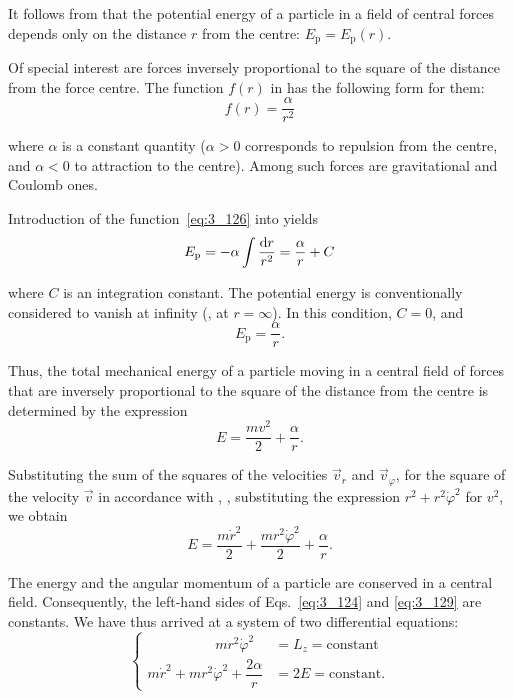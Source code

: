 \noindent
It follows from  that the potential energy of a particle in a field of central forces depends only on the distance $r$ from the centre: $E_{\text{p}}=E_{\text{p}}(r)$.

Of special interest are forces inversely proportional to the square of the distance from the force centre. The function $f(r)$ in  has the following form for them:
\begin{equation}\label{eq:3_126}
f(r) = \frac{\alpha}{r^2}
\end{equation}

\noindent
where $\alpha$ is a constant quantity ($\alpha>0$ corresponds to repulsion from the centre, and $\alpha<0$ to attraction to the centre). Among such forces are gravitational and Coulomb ones.

Introduction of the function~\eqref{eq:3_126} into  yields
\begin{equation*}
E_{\text{p}} = -\alpha \int \frac{\mathrm{d} r}{r^2} = \frac{\alpha}{r} + C
\end{equation*}

\noindent
where $C$ is an integration constant. The potential energy is conventionally considered to vanish at infinity (\ie, at $r=\infty$). In this condition, $C=0$, and
\begin{equation}\label{eq:3_127}
E_{\text{p}} = \frac{\alpha}{r}.
\end{equation}

\noindent
Thus, the total mechanical energy of a particle moving in a central field of forces that are inversely proportional to the square of the distance from the centre is determined by the expression
\begin{equation}\label{eq:3_128}
E = \frac{mv^2}{2} + \frac{\alpha}{r}.
\end{equation}

\noindent
Substituting the sum of the squares of the velocities $\vec{v}_r$ and $\vec{v}_{\varphi}$, for the square of the velocity $\vec{v}$ in accordance with , \ie, substituting the expression $r^2+r^2\dot{\varphi}^2$ for $v^2$, we obtain
\begin{equation}\label{eq:3_129}
E = \frac{m\dot{r}^2}{2} + \frac{mr^2\dot{\varphi}^2}{2} + \frac{\alpha}{r}.
\end{equation}

The energy and the angular momentum of a particle are conserved in a central field. Consequently, the left-hand sides of Eqs.~\eqref{eq:3_124} and \eqref{eq:3_129} are constants. We have thus arrived at a system of two differential equations:
\begin{equation}\label{eq:3_130}
\begin{cases}
\quad\quad\quad\quad\,\,\,\,\, mr^2\dot{\varphi}^2 \!\!\!\!&= L_z = \text{constant}\\
m\dot{r}^2 + mr^2\dot{\varphi}^2 + \dfrac{2\alpha}{r} \!\!\!\!&= 2E = \text{constant}.
\end{cases}
\end{equation}


